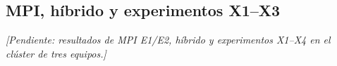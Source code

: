 \subsection{MPI, híbrido y experimentos X1--X3}

\textit{[Pendiente: resultados de MPI E1/E2, híbrido y experimentos X1--X4 en el clúster de tres equipos.]}
